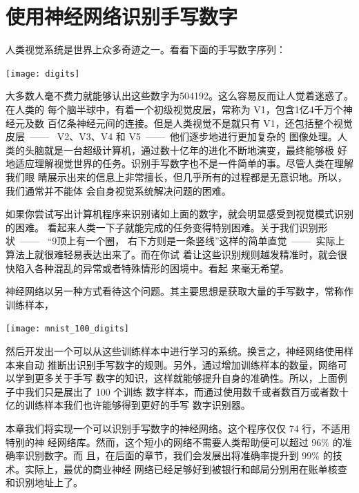 
\chapter{使用神经网络识别手写数字}
\label{ch:UsingNeuralNetsToRecognizeHandwrittenDigits}

人类视觉系统是世界上众多奇迹之一。看看下面的手写数字序列：
\begin{center}
  \texttt{[image: digits]}\label{fig:digits}
\end{center}

大多数人毫不费力就能够认出这些数字为504192。这么容易反而让人觉着迷惑了。在人类的
每个脑半球中，有着一个初级视觉皮层，常称为 {\serif V1}，包含1亿4千万个神经元及数
百亿条神经元间的连接。但是人类视觉不是就只有 {\serif V1}，还包括整个视觉皮层~——~
{\serif V2}、{\serif V3}、{\serif V4} 和 {\serif V5}~——~他们逐步地进行更加复杂的
图像处理。人类的头脑就是一台超级计算机，通过数十亿年的进化不断地演变，最终能够极
好地适应理解视觉世界的任务。识别手写数字也不是一件简单的事。尽管人类在理解我们眼
睛展示出来的信息上非常擅长，但几乎所有的过程都是无意识地。所以，我们通常并不能体
会自身视觉系统解决问题的困难。

如果你尝试写出计算机程序来识别诸如上面的数字，就会明显感受到视觉模式识别的困难。
看起来人类一下子就能完成的任务变得特别困难。关于我们识别形状~——~ “9顶上有一个圈，
右下方则是一条竖线”这样的简单直觉~——~实际上算法上就很难轻易表达出来了。而在你试
着让这些识别规则越发精准时，就会很快陷入各种混乱的异常或者特殊情形的困境中。看起
来毫无希望。

神经网络以另一种方式看待这个问题。其主要思想是获取大量的手写数字，常称作训练样本，
\begin{center}
  \texttt{[image: mnist\_100\_digits]}
\end{center}

然后开发出一个可以从这些训练样本中进行学习的系统。换言之，神经网络使用样本来自动
推断出识别手写数字的规则。另外，通过增加训练样本的数量，网络可以学到更多关于手写
数字的知识，这样就能够提升自身的准确性。所以，上面例子中我们只是展出了 100 个训练
数字样本，而通过使用数千或者数百万或者数十亿的训练样本我们也许能够得到更好的手写
数字识别器。

本章我们将实现一个可以识别手写数字的神经网络。这个程序仅仅 74 行，不适用特别的神
经网络库。然而，这个短小的网络不需要人类帮助便可以超过 96\% 的准确率识别数字。而
且，在后面的章节，我们会发展出将准确率提升到 99\% 的技术。实际上，最优的商业神经
网络已经足够好到被银行和邮局分别用在账单核查和识别地址上了。

